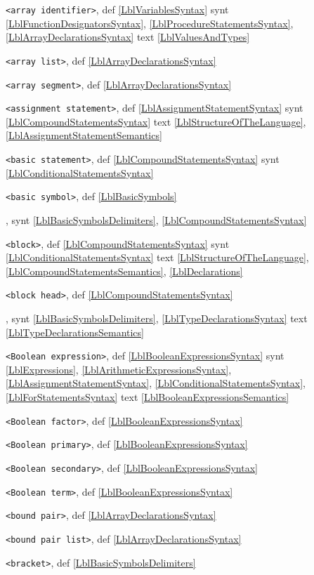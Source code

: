 \documentclass[a4paper,11pt]{article}
\begin{document}
\texttt{<array identifier>},
def
\ref{LblVariablesSyntax}
synt
\ref{LblFunctionDesignatorsSyntax},
\ref{LblProcedureStatementsSyntax},
\ref{LblArrayDeclarationsSyntax}
text
\ref{LblValuesAndTypes}\*

\texttt{<array list>},
def
\ref{LblArrayDeclarationsSyntax}\*

\texttt{<array segment>},
def
\ref{LblArrayDeclarationsSyntax}\*

\texttt{<assignment statement>},
def
\ref{LblAssignmentStatementSyntax}
synt
\ref{LblCompoundStatementsSyntax}
text
\ref{LblStructureOfTheLanguage},
\ref{LblAssignmentStatementSemantics}\*

\texttt{<basic statement>},
def
\ref{LblCompoundStatementsSyntax}
synt
\ref{LblConditionalStatementsSyntax}\*

\texttt{<basic symbol>},
def
\ref{LblBasicSymbols}\*

,
synt
\ref{LblBasicSymbolsDelimiters},
\ref{LblCompoundStatementsSyntax}\*

\texttt{<block>},
def
\ref{LblCompoundStatementsSyntax}
synt
\ref{LblConditionalStatementsSyntax}
text
\ref{LblStructureOfTheLanguage},
\ref{LblCompoundStatementsSemantics},
\ref{LblDeclarations}\*

\texttt{<block head>},
def
\ref{LblCompoundStatementsSyntax}\*

,
synt
\ref{LblBasicSymbolsDelimiters},
\ref{LblTypeDeclarationsSyntax}
text
\ref{LblTypeDeclarationsSemantics}\*

\texttt{<Boolean expression>},
def
\ref{LblBooleanExpressionsSyntax}
synt
\ref{LblExpressions},
\ref{LblArithmeticExpressionsSyntax},
\ref{LblAssignmentStatementSyntax},
\ref{LblConditionalStatementsSyntax},
\ref{LblForStatementsSyntax}
text
\ref{LblBooleanExpressionsSemantics}\*

\texttt{<Boolean factor>},
def
\ref{LblBooleanExpressionsSyntax}\*

\texttt{<Boolean primary>},
def
\ref{LblBooleanExpressionsSyntax}\*

\texttt{<Boolean secondary>},
def
\ref{LblBooleanExpressionsSyntax}\*

\texttt{<Boolean term>},
def
\ref{LblBooleanExpressionsSyntax}\*

\texttt{<bound pair>},
def
\ref{LblArrayDeclarationsSyntax}\*

\texttt{<bound pair list>},
def
\ref{LblArrayDeclarationsSyntax}\*

\texttt{<bracket>},
def
\ref{LblBasicSymbolsDelimiters}\*
\end{document}
